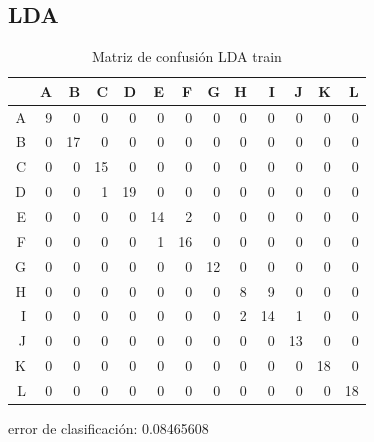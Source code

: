 \documentclass[pdf]{beamer}
\begin{document}
\subsection{LDA}
\begin{frame}

\begin{table}[ht]
\begin{adjustbox}{width= 3.5in,center}
\centering
\begin{tabular}{rrrrrrrrrrrrr}
  \hline
 & A & B & C & D & E & F & G & H & I & J & K & L \\ 
  \hline
A &   9 &   0 &   0 &   0 &   0 &   0 &   0 &   0 &   0 &   0 &   0 &   0 \\ 
  B &   0 &  17 &   0 &   0 &   0 &   0 &   0 &   0 &   0 &   0 &   0 &   0 \\ 
  C &   0 &   0 &  15 &   0 &   0 &   0 &   0 &   0 &   0 &   0 &   0 &   0 \\ 
  D &   0 &   0 &   1 &  19 &   0 &   0 &   0 &   0 &   0 &   0 &   0 &   0 \\ 
  E &   0 &   0 &   0 &   0 &  14 &   2 &   0 &   0 &   0 &   0 &   0 &   0 \\ 
  F &   0 &   0 &   0 &   0 &   1 &  16 &   0 &   0 &   0 &   0 &   0 &   0 \\ 
  G &   0 &   0 &   0 &   0 &   0 &   0 &  12 &   0 &   0 &   0 &   0 &   0 \\ 
  H &   0 &   0 &   0 &   0 &   0 &   0 &   0 &   8 &   9 &   0 &   0 &   0 \\ 
  I &   0 &   0 &   0 &   0 &   0 &   0 &   0 &   2 &  14 &   1 &   0 &   0 \\ 
  J &   0 &   0 &   0 &   0 &   0 &   0 &   0 &   0 &   0 &  13 &   0 &   0 \\ 
  K &   0 &   0 &   0 &   0 &   0 &   0 &   0 &   0 &   0 &   0 &  18 &   0 \\ 
  L &   0 &   0 &   0 &   0 &   0 &   0 &   0 &   0 &   0 &   0 &   0 &  18 \\ 
   \hline
\end{tabular}
\end{adjustbox}
	\label{tabla:confusionLDAtrain}
	\caption{Matriz de confusión LDA train}
\end{table}

error de clasificación:  0.08465608
\end{frame}
\end{document}
